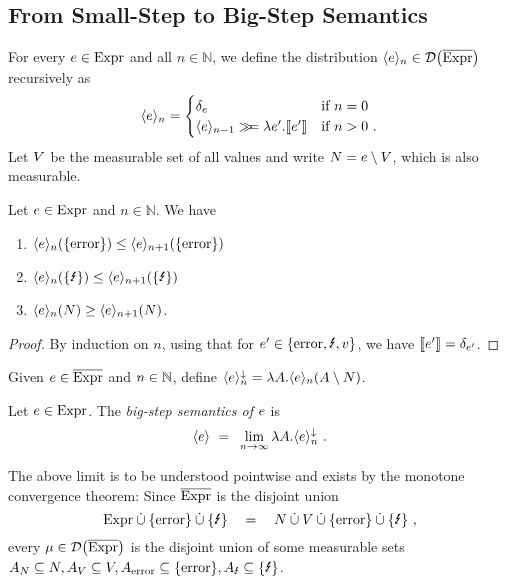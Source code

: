 \subsection{From Small-Step to Big-Step Semantics}
%
%
%
For every $e \in \textnormal{Expr}$ and all $n \in \mathbb{N}$, we define the distribution $\langle e \rangle_{n} \in \mathcal{D} \big( {\overline{\textnormal{Expr}}} \big)$ recursively as
%
\[
	\langle e \rangle_{n} = 
	\begin{cases}
		\delta_e & \text{if $n=0$} \\
		\langle e \rangle_{n-1} \gg\!\!=  \lambda e'. \llbracket e' \rrbracket & \text{if $n>0$}~.
	\end{cases}
\]
%
Let $V$ be the measurable set of all values and write $N = e \setminus V$, which is also measurable.
%
%
\begin{lemma}
	\label{lem:props:bigstepsem}
	Let $e \in \textnormal{Expr}$ and $n \in \mathbb{N}$. We have
	\begin{enumerate}
		\item\label{lem:props:bigstepsem1} $\langle e \rangle_{n}(\{\textnormal{error}\}) \leq \langle e \rangle_{n+1}(\{\textnormal{error}\})$
		\item\label{lem:props:bigstepsem2} $\bigsemstep{\expr}{n}(\{\obsfail\}) \leq \bigsemstep{\expr}{n+1}(\{\obsfail\})$
		\item\label{lem:props:bigstepsem3} $\langle e \rangle_{n}(N) \geq \langle e \rangle_{n+1}(N)$.
	\end{enumerate}
\end{lemma}
%
\begin{proof}
	By induction on $n$, using that for $\expr' \in \{ \error,\obsfail,\val \}$, we have $\llbracket e' \rrbracket = \delta_{e'}$.
\end{proof}
%
%
Given $e\in{\overline{\textnormal{Expr}}}$ and $n\in\mathbb{N}$, define $\langle e \rangle_{n}^{\downarrow} = \lambda A. \langle e \rangle_{n}(A \setminus N)$. 
\begin{definition}
	Let $e \in \textnormal{Expr}$. The \emph{big-step semantics of $e$} is 
	\[
		\langle e \rangle ~{}={}~ \lim_{n \to \infty} \lambda A.
		\langle e \rangle_{n}^{\downarrow}~.
	\]
\end{definition}
%
The above limit is to be understood pointwise and exists by the monotone convergence theorem:  Since ${\overline{\textnormal{Expr}}}$ is the disjoint union 
%
\[
	 \exprs \discup  \{ \error \} \discup \{ \obsfail \} 
	 \quad {}={} \quad
	 \nonvals \discup \vals \discup \{ \error \} \discup \{ \obsfail \}~,
\]
%
every $\mu \in \mathcal{D} \big( {\overline{\textnormal{Expr}}} \big)$ is the disjoint union of some measurable sets $\measset_{\nonvals} \subseteq \nonvals, \measset_{\vals}\subseteq\vals, \measset_{\error}\subseteq \{\error\},\measset_{\obsfail}\subseteq\{\obsfail\}$. 
%

